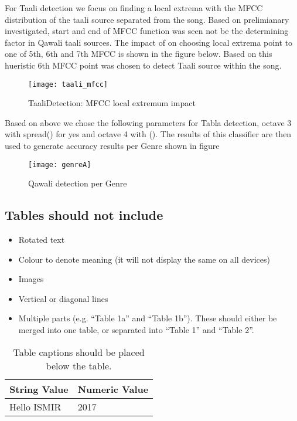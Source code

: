 \documentclass{article}
\begin{document}
For Taali detection we focus on finding a local extrema with the MFCC distribution of the taali source separated from the song. Based on prelimianary investigated, start and end of MFCC function was seen not be the determining factor in Qawali taali sources. The impact of on choosing local extrema point to one of 5th, 6th and 7th MFCC is shown in the figure below. Based on this hueristic 6th MFCC point was chosen to detect Taali source within the song.
\begin{figure}[htbp]
  \centering
  \texttt{[image: taali\_mfcc]}
  \caption{TaaliDetection: MFCC local extremum impact}
\label{fig:src_mfcc}
\end{figure}

Based on above we chose the following parameters for Tabla detection, octave 3 with spread() for yes and octave 4 with (). The results of this classifier are then used to generate accuracy results per Genre shown in figure
\begin{figure}[htbp]
  \centering
  \texttt{[image: genreA]}
  \caption{Qawali detection per Genre}
\label{fig:src_genre}
\end{figure}

\subsection{Tables should not include}

\begin{itemize}
  \item Rotated text
  \item Colour to denote meaning (it will not display the same on all devices)
  \item Images
  \item Vertical or diagonal lines
  \item Multiple parts (e.g. ``Table 1a'' and ``Table 1b'').
  These should either be merged into one table,
  or separated into ``Table 1'' and ``Table 2''.
\end{itemize}

\begin{table}[htpb]
\centering
  \begin{tabular}{ll}
  \toprule
  \bfseries String Value & \bfseries Numeric Value \\ \midrule
  Hello ISMIR  & 2017          \\
  \bottomrule
  \end{tabular}
  \caption{Table captions should be placed below the table.}
\label{tab:table}
\end{table}
\end{document}
